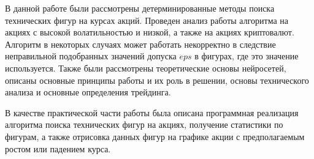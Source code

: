 \documentclass[bachelor, och, coursework]{SCWorks}
\begin{document}





\conclusion

    В данной работе были рассмотрены детерминированные методы поиска технических
    фигур на курсах акций. Проведен анализ работы алгоритма на акциях с высокой
    волатильностью и низкой, а также на акциях криптовалют. Алгоритм в некоторых
    случаях может работать некорректно в следствие неправильной подобранных
    значений допуска $eps$ в фигурах, где это значение используется. Также были 
    рассмотрены теоретические основы нейросетей, описаны основные
    принципы работы и их роль в решении, основы технического анализа и основные
    определения трейдинга. 

    В качестве практической части работы была описана программная реализация
    алгоритма поиска технических фигур на акциях, получение статистики по фигурам, 
    а также отрисовка данных фигур на графике акции с предполагаемым ростом или 
    падением курса.
\end{document}
